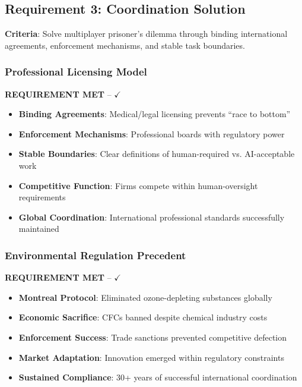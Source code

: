 \documentclass[11pt,a4paper]{article}
\newcommand{\greencheckmark}{{\color{validationgreen}\textbf{$\checkmark$}}}
\newcommand{\requirement}[1]{\textcolor{secondaryblue}{\textbf{#1}}}
\newcommand{\evidence}[1]{\textcolor{validationgreen}{\textbf{#1}}}
\begin{document}
\subsection{Requirement 3: Coordination Solution}

\requirement{Criteria}: Solve multiplayer prisoner's dilemma through binding international agreements, enforcement mechanisms, and stable task boundaries.

\subsubsection{Professional Licensing Model}

\evidence{REQUIREMENT MET} -- \greencheckmark

\begin{itemize}[leftmargin=*]
\item \textbf{Binding Agreements}: Medical/legal licensing prevents ``race to bottom''
\item \textbf{Enforcement Mechanisms}: Professional boards with regulatory power
\item \textbf{Stable Boundaries}: Clear definitions of human-required vs. AI-acceptable work
\item \textbf{Competitive Function}: Firms compete within human-oversight requirements
\item \textbf{Global Coordination}: International professional standards successfully maintained
\end{itemize}

\subsubsection{Environmental Regulation Precedent}

\evidence{REQUIREMENT MET} -- \greencheckmark

\begin{itemize}[leftmargin=*]
\item \textbf{Montreal Protocol}: Eliminated ozone-depleting substances globally
\item \textbf{Economic Sacrifice}: CFCs banned despite chemical industry costs
\item \textbf{Enforcement Success}: Trade sanctions prevented competitive defection
\item \textbf{Market Adaptation}: Innovation emerged within regulatory constraints
\item \textbf{Sustained Compliance}: 30+ years of successful international coordination
\end{itemize}
\end{document}
